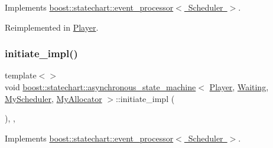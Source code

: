 Implements \mbox{\hyperlink{classboost_1_1statechart_1_1event__processor_a48a2bfcad66582f6c88e6034b2b838cb}{boost\+::statechart\+::event\+\_\+processor$<$ Scheduler $>$}}.



Reimplemented in \mbox{\hyperlink{struct_player_ae5001b1a7c1ba022d7bdb6d7da25e647}{Player}}.

\mbox{\label{classboost_1_1statechart_1_1asynchronous__state__machine_a7c4de22b056f8a85f2c163b6c5677f23}} 
\subsubsection{\texorpdfstring{initiate\+\_\+impl()}{initiate\_impl()}\hspace{0.1cm}{\footnotesize\ttfamily [2/2]}}
{\footnotesize\ttfamily template$<$$>$ \\
void \mbox{\hyperlink{classboost_1_1statechart_1_1asynchronous__state__machine}{boost\+::statechart\+::asynchronous\+\_\+state\+\_\+machine}}$<$ \mbox{\hyperlink{struct_player}{Player}}, \mbox{\hyperlink{struct_waiting}{Waiting}}, \mbox{\hyperlink{_player_8hpp_a24a1f41c11f96c5934bd8e82b4fb2805}{My\+Scheduler}}, \mbox{\hyperlink{_player_8hpp_ab302cdbc6b094291e393ac49d404d75a}{My\+Allocator}} $>$\+::initiate\+\_\+impl (\begin{DoxyParamCaption}{ }\end{DoxyParamCaption})\hspace{0.3cm}{\ttfamily [inline]}, {\ttfamily [private]}, {\ttfamily [virtual]}}



Implements \mbox{\hyperlink{classboost_1_1statechart_1_1event__processor_a48a2bfcad66582f6c88e6034b2b838cb}{boost\+::statechart\+::event\+\_\+processor$<$ Scheduler $>$}}.

\mbox{\label{classboost_1_1statechart_1_1asynchronous__state__machine_a3e4a4a8910ec610542fc41dba4fd2d04}} 
